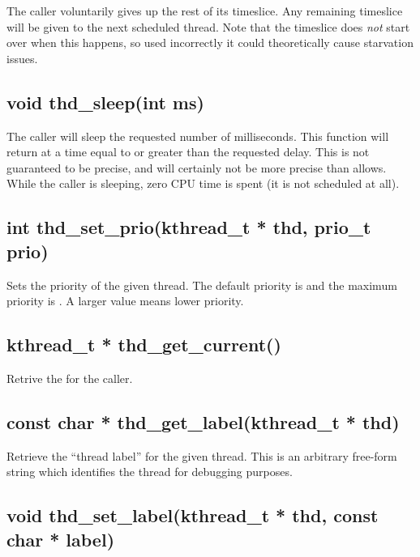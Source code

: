 \documentclass[english]{report}
\begin{document}
The caller voluntarily gives up the rest of its timeslice. Any remaining
timeslice will be given to the next scheduled thread. Note that the
timeslice does \emph{not} start over when this happens, so used incorrectly
it could theoretically cause starvation issues.


\subsection{void thd\_sleep(int ms)}

The caller will sleep the requested number of milliseconds. This function
will return at a time equal to or greater than the requested delay.
This is not guaranteed to be precise, and will certainly not be more
precise than  allows. While the caller is sleeping, zero CPU time
is spent (it is not scheduled at all).


\subsection{int thd\_set\_prio(kthread\_t * thd, prio\_t prio)}

Sets the priority of the given thread. The default priority is 
and the maximum priority is . A larger value means lower priority.


\subsection{kthread\_t * thd\_get\_current()}

Retrive the  for the caller.


\subsection{const char * thd\_get\_label(kthread\_t * thd)}

Retrieve the ``thread label'' for the given thread. This is an
arbitrary free-form string which identifies the thread for debugging
purposes.


\subsection{void thd\_set\_label(kthread\_t * thd, const char * label)}
\end{document}
